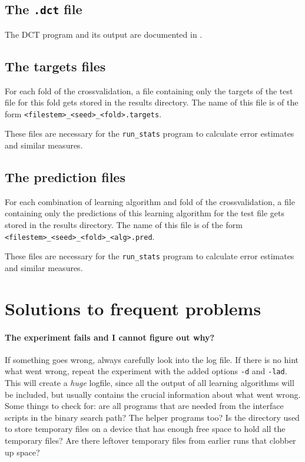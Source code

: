 \documentclass[a4paper,10pt,twoside]{article}
\begin{document}
\subsection{The \texttt{.dct} file}

The DCT program and its output are documented in \cite{dct}.

\subsection{The targets files}

For each fold of the crossvalidation, a file containing only
the targets of the test file for this fold gets stored 
in the results directory. The name of this file
is of the form \verb=<filestem>_<seed>_<fold>.targets=.

These files are necessary for the \verb=run_stats= program
to calculate error estimates and similar measures.
\subsection{The prediction files}

For each combination of learning algorithm and fold of the crossvalidation,
a file containing only
the predictions of this learning algorithm for the test file gets stored 
in the results directory. The name of this file
is of the form \verb=<filestem>_<seed>_<fold>_<alg>.pred=.

These files are necessary for the \verb=run_stats= program
to calculate error estimates and similar measures.


\section{Solutions to frequent problems}

\paragraph{The experiment fails and I cannot figure out why?}
If something goes wrong, always carefully look into the log file.
If there is no hint what went wrong, repeat the experiment with 
the added options \texttt{-d} and \texttt{-lad}. This will
create a \emph{huge} logfile, since all the output of all 
learning algorithms will be included, but usually contains
the crucial information about what went wrong. 
Some things to check for: are all programs that are needed from 
the interface scripts in the binary search path? The helper 
programs too? Is the directory used to store temporary files
on a device that has enough free space to hold all the temporary files?
Are there leftover temporary files from earlier runs that clobber 
up space?
\end{document}
